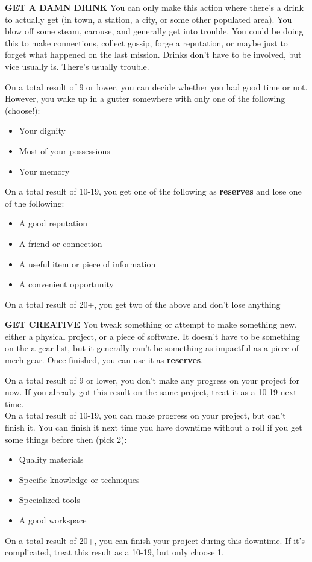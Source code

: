 \textbf{GET A DAMN DRINK}
You can only make this action where there's a drink to actually get (in town, a station, a city, or some other populated area). You blow off some steam, carouse, and generally get into trouble. You could be doing this to make connections, collect gossip, forge a reputation, or maybe just to forget what happened on the last mission. Drinks don't have to be involved, but vice usually is. There's usually trouble.

On a total result of 9 or lower, you can decide whether you had good time or not. However, you wake up in a gutter somewhere with only one of the following (choose!):
\begin{itemize}
\item Your dignity
\item Most of your possessions
\item Your memory
\end{itemize}  
On a total result of 10-19, you get one of the following as \textbf{reserves} and lose one of the following:
\begin{itemize}
\item A good reputation
\item A friend or connection
\item A useful item or piece of information
\item A convenient opportunity
\end{itemize}  
On a total result of 20+, you get two of the above and don't lose anything

\textbf{GET CREATIVE}
You tweak something or attempt to make something new, either a physical project, or a piece of software. It doesn't have to be something on the a gear list, but it generally can't be something as impactful as a piece of mech gear. Once finished, you can use it as \textbf{reserves}. 

On a total result of 9 or lower, you don't make any progress on your project for now. If you already got this result on the same project, treat it as a 10-19 next time.\\
On a total result of 10-19, you can make progress on your project, but can't finish it. You can finish it next time you have downtime without a roll if you get some things before then (pick 2):
\begin{itemize}
\item Quality materials
\item Specific knowledge or techniques
\item Specialized tools
\item A good workspace
\end{itemize}  
On a total result of 20+, you can finish your project during this downtime. If it's complicated, treat this result as a 10-19, but only choose 1.

